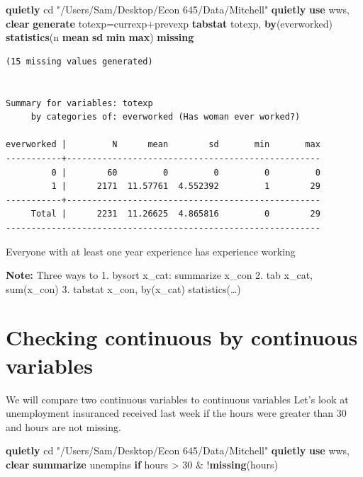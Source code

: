\documentclass[
]{book}
\newenvironment{Shaded}{\begin{snugshade}}{\end{snugshade}}
\newcommand{\FunctionTok}[1]{\textcolor[rgb]{0.13,0.29,0.53}{\textbf{#1}}}
\newcommand{\KeywordTok}[1]{\textcolor[rgb]{0.13,0.29,0.53}{\textbf{#1}}}
\newcommand{\NormalTok}[1]{#1}
\newcommand{\StringTok}[1]{\textcolor[rgb]{0.31,0.60,0.02}{#1}}
\begin{document}
\begin{Shaded}
\begin{Highlighting}[]
\KeywordTok{quietly}\NormalTok{ cd }\StringTok{"/Users/Sam/Desktop/Econ 645/Data/Mitchell"}
\KeywordTok{quietly} \KeywordTok{use}\NormalTok{ wws, }\KeywordTok{clear}
\KeywordTok{generate}\NormalTok{ totexp=currexp+prevexp}
\KeywordTok{tabstat}\NormalTok{ totexp, }\KeywordTok{by}\NormalTok{(everworked) }\KeywordTok{statistics}\NormalTok{(n }\KeywordTok{mean} \FunctionTok{sd} \FunctionTok{min} \FunctionTok{max}\NormalTok{) }\FunctionTok{missing}
\end{Highlighting}
\end{Shaded}

\begin{verbatim}
(15 missing values generated)


Summary for variables: totexp
     by categories of: everworked (Has woman ever worked?)

everworked |         N      mean        sd       min       max
-----------+--------------------------------------------------
         0 |        60         0         0         0         0
         1 |      2171  11.57761  4.552392         1        29
-----------+--------------------------------------------------
     Total |      2231  11.26625  4.865816         0        29
--------------------------------------------------------------
\end{verbatim}

Everyone with at least one year experience has experience working

\textbf{Note:}
Three ways to
1. bysort x\_cat: summarize x\_con
2. tab x\_cat, sum(x\_con)
3. tabstat x\_con, by(x\_cat) statistics(\ldots)

\section{Checking continuous by continuous variables}\label{checking-continuous-by-continuous-variables}

We will compare two continuous variables to continuous variables Let's look at unemployment insuranced received last week if the hours were greater than 30 and hours are not missing.

\begin{Shaded}
\begin{Highlighting}[]
\KeywordTok{quietly}\NormalTok{ cd }\StringTok{"/Users/Sam/Desktop/Econ 645/Data/Mitchell"}
\KeywordTok{quietly} \KeywordTok{use}\NormalTok{ wws, }\KeywordTok{clear}
\KeywordTok{summarize}\NormalTok{ unempins }\KeywordTok{if}\NormalTok{ hours \textgreater{} 30 \& !}\FunctionTok{missing}\NormalTok{(hours)}
\end{Highlighting}
\end{Shaded}
\end{document}
